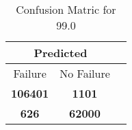 \begin{table}[] 
\caption{Confusion Matric for 99.0} 
\label{Table: Prediction Accuracy-DMD99.0OnlySunEKF-combinationReflection-Reflection} 
\centering 
\begin{tabular} 
 {@{}ccc@{}} 
\toprule 
\multicolumn{2}{c}{\textbf{Predicted}}
 \\ \midrule 
\multicolumn{1}{|c|}{Failure} & 
\multicolumn{1}{c|}{No Failure}
 \\ \midrule 
\multicolumn{1}{|c|}{\color{green}\textbf{106401}} & 
\multicolumn{1}{c|}{\color{red}\textbf{1101}}
 \\ \midrule 
\multicolumn{1}{|c|}{\color{red}\textbf{626}} & 
\multicolumn{1}{c|}{\color{green}\textbf{62000}}
 \\ \bottomrule 
\end{tabular} 
\end{table} 
